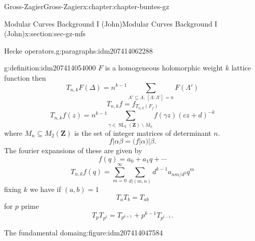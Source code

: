 \documentclass[oneside,10pt,]{book}
\numberwithin{equation}{section}
\newcommand{\ZZ}{\mathbf{Z}}
\DeclareMathOperator{\SL}{SL}
\begin{document}
\begin{chapterptx}{Gross-Zagier}{}{Gross-Zagier}{}{}{x:chapter:chapter-buntes-gz}
\begin{sectionptx}{Modular Curves Background I (John)}{}{Modular Curves Background I (John)}{}{}{x:section:sec-gz-mfs}
\begin{paragraphs}{Hecke operators.}{g:paragraphs:idm207414062288}
\begin{definition}{}{g:definition:idm207414054000}
\(F\) is a homogeneous holomorphic weight \(k\) lattice function then%
\begin{equation*}
T_{n,k} F(\Delta ) = n^{k-1} \sum_{\Lambda ' \subseteq \Lambda ,\,[\Lambda : \Lambda '] = n} F(\Lambda ')
\end{equation*}
%
\begin{equation*}
T_{n,k}f = f_{T_{n,k}(F_f)}
\end{equation*}
%
\begin{equation*}
T_{n,k} f(z) = n^{k-1} \sum_{\gamma \in \SL_2(\ZZ)\backslash  M_n } f(\gamma  z)(cz+d)^{-k}
\end{equation*}
where \(M_n \subseteq  M_2(\ZZ)\) is the set of integer matrices of determinant \(n\).%
\begin{equation*}
f|\alpha \beta = (f|\alpha )|\beta \text{.}
\end{equation*}
The fourier expansions of these are given by%
\begin{equation*}
f(q) = a_0 + a_1 q + \cdots
\end{equation*}
%
\begin{equation*}
T_{n,k}f(q) = \sum_{m = 0}^\infty \sum_{d|(m,n)} d^{k-1} a_{nm/d^2} q^m
\end{equation*}
fixing \(k\) we have if \((a,b) = 1\)%
\begin{equation*}
T_aT_b = T_{ab}
\end{equation*}
for \(p \) prime%
\begin{equation*}
T_p T_{p^t} = T_{p^{k+1}} + p^{k-1} T_{p^{t-1}}\text{.}
\end{equation*}
%
\end{definition}
\begin{figureptx}{The fundamental domain}{g:figure:idm207414047584}{}%
\begin{image}{0}{1}{0}%
\end{image}
\end{figureptx}
\end{paragraphs}
\end{sectionptx}
\end{chapterptx}
\end{document}
